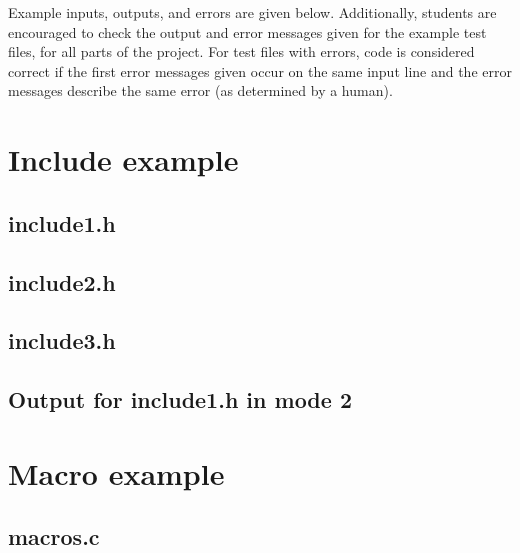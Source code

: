 \documentclass{article}
\begin{document}
Example inputs, outputs, and errors are given below.
Additionally, students are encouraged to check the output and error messages
given for the example test files, for all parts of the project.
For test files with errors,
code is considered correct if the first error messages given
occur on the same input line and the error messages describe the
same error (as determined by a human).



\section{Include example}

\subsection{include1.h}



\subsection{include2.h}



\subsection{include3.h}



\subsection{Output for include1.h in mode 2}




\section{Macro example}

\subsection{macros.c}
\end{document}
